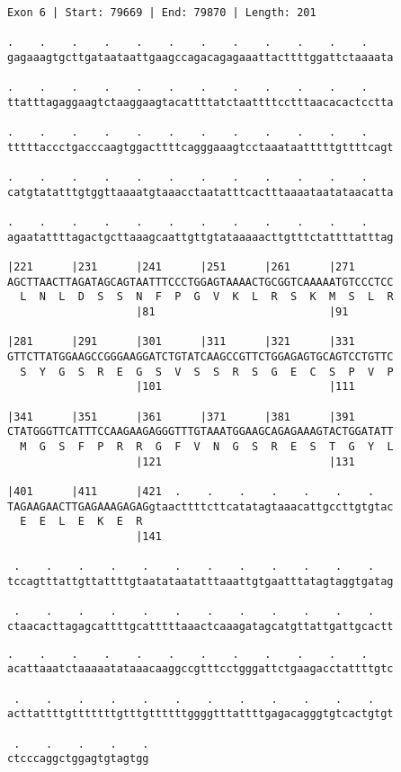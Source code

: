 \documentclass{article}
\begin{document}
\begin{Verbatim}[fontfamily=courier]
Exon 6 | Start: 79669 | End: 79870 | Length: 201

.    .    .    .    .    .    .    .    .    .    .    .    
gagaaagtgcttgataataattgaagccagacagagaaattacttttggattctaaaata

.    .    .    .    .    .    .    .    .    .    .    .    
ttatttagaggaagtctaaggaagtacattttatctaattttcctttaacacactcctta

.    .    .    .    .    .    .    .    .    .    .    .    
tttttaccctgacccaagtggacttttcagggaaagtcctaaataatttttgttttcagt

.    .    .    .    .    .    .    .    .    .    .    .    
catgtatatttgtggttaaaatgtaaacctaatatttcactttaaaataatataacatta

.    .    .    .    .    .    .    .    .    .    .    .    
agaatattttagactgcttaaagcaattgttgtataaaaacttgtttctattttatttag

|221      |231      |241      |251      |261      |271      
AGCTTAACTTAGATAGCAGTAATTTCCCTGGAGTAAAACTGCGGTCAAAAATGTCCCTCC
  L  N  L  D  S  S  N  F  P  G  V  K  L  R  S  K  M  S  L  R
                    |81                           |91       

|281      |291      |301      |311      |321      |331      
GTTCTTATGGAAGCCGGGAAGGATCTGTATCAAGCCGTTCTGGAGAGTGCAGTCCTGTTC
  S  Y  G  S  R  E  G  S  V  S  S  R  S  G  E  C  S  P  V  P
                    |101                          |111      

|341      |351      |361      |371      |381      |391      
CTATGGGTTCATTTCCAAGAAGAGGGTTTGTAAATGGAAGCAGAGAAAGTACTGGATATT
  M  G  S  F  P  R  R  G  F  V  N  G  S  R  E  S  T  G  Y  L
                    |121                          |131      

|401      |411      |421  .    .    .    .    .    .    .   
TAGAAGAACTTGAGAAAGAGAGgtaacttttcttcatatagtaaacattgccttgtgtac
  E  E  L  E  K  E  R                                       
                    |141                                    

 .    .    .    .    .    .    .    .    .    .    .    .   
tccagtttattgttattttgtaatataatatttaaattgtgaatttatagtaggtgatag

 .    .    .    .    .    .    .    .    .    .    .    .   
ctaacacttagagcattttgcatttttaaactcaaagatagcatgttattgattgcactt

\end{Verbatim}
\newpage
\begin{Verbatim}[fontfamily=courier]
 .    .    .    .    .    .    .    .    .    .    .    .   
acattaaatctaaaaatataaacaaggccgtttcctgggattctgaagacctattttgtc

 .    .    .    .    .    .    .    .    .    .    .    .   
acttattttgtttttttgtttgttttttggggtttattttgagacagggtgtcactgtgt

 .    .    .    .    .
ctcccaggctggagtgtagtgg
\end{Verbatim}
\end{document}
